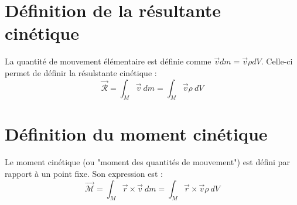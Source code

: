 \section*{Définition de la résultante cinétique}
    La quantité de mouvement élémentaire est définie comme $\vec v dm = \vec{v}\rho dV$. Celle-ci 
    permet de définir la résulstante cinétique :
    \begin{equation}
    \vec{\mathcal{R}} = \int_M \vec{v}\ dm = \int_M \vec{v}\rho\ dV
    \end{equation}
    
\section*{Définition du moment cinétique}
    Le moment cinétique (ou "moment des quantités de mouvement") est défini par rapport à un point 
    fixe. Son expression est :
    \begin{equation}
    \vec{\mathcal{M}} = \int_M \vec{r}\times\vec{v}\ dm = \int_M \vec{r}\times\vec{v}\rho\ dV 
    \end{equation}